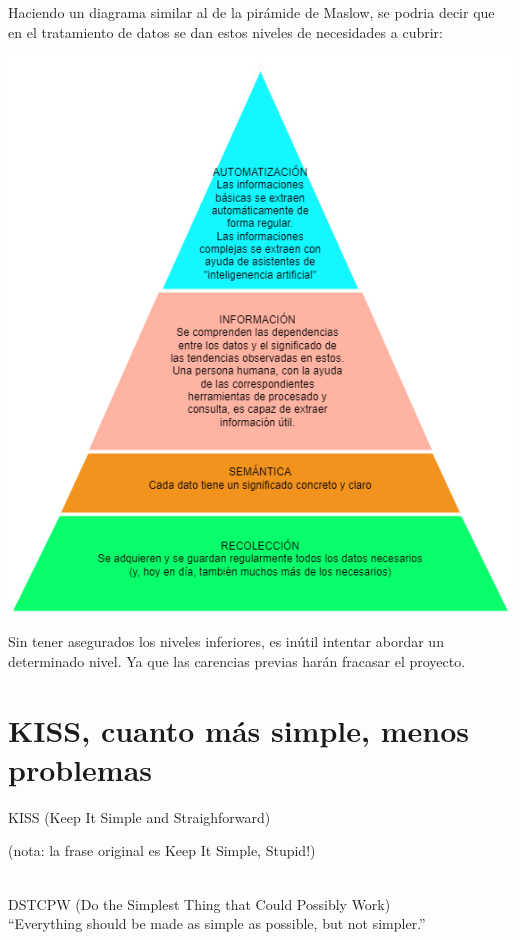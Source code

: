 \documentclass[spanish,12pt,a4paper,final,oneside]{book}
\begin{document}
\vspace{1cm}

Haciendo un diagrama similar al de la pirámide de Maslow, se podria decir que en el tratamiento de datos se dan estos niveles de necesidades a cubrir:

\includegraphics[width=\textwidth]{PiramideDeTratamientoDeDatos}

Sin tener asegurados los niveles inferiores, es inútil intentar abordar un determinado nivel. Ya que las carencias previas harán fracasar el proyecto.




\section{KISS, cuanto más simple, menos problemas}
KISS (Keep It Simple and Straighforward) \begin{tiny}(nota: la frase original es Keep It Simple, Stupid!)\end{tiny}
\\DSTCPW (Do the Simplest Thing that Could Possibly Work)
\\``Everything should be made as simple as possible, but not simpler.''
\end{document}
